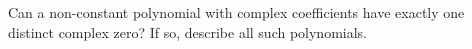 Can a non-constant polynomial with complex coefficients have exactly one distinct complex zero? If so, describe all such polynomials.
